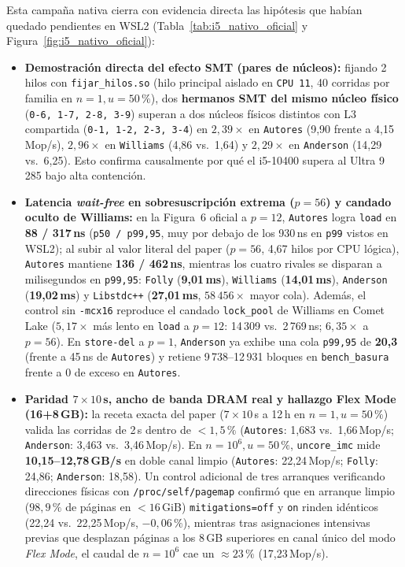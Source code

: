 \documentclass[11pt,a4paper]{article}
\newcommand{\us}{\,\text{\textmu s}}
\begin{document}
Esta campaña nativa cierra con evidencia directa las hipótesis que habían quedado pendientes en WSL2 (Tabla~\ref{tab:i5_nativo_oficial} y Figura~\ref{fig:i5_nativo_oficial}):
\begin{itemize}
  \item \textbf{Demostración directa del efecto SMT (pares de núcleos):} fijando 2 hilos con \texttt{fijar\_hilos.so} (hilo principal aislado en \texttt{CPU 11}, 40 corridas por familia en $n=1, u=50\,\%$), dos \textbf{hermanos SMT del mismo núcleo físico} (\texttt{0-6, 1-7, 2-8, 3-9}) superan a dos núcleos físicos distintos con L3 compartida (\texttt{0-1, 1-2, 2-3, 3-4}) en \textbf{$2,39\times$} en \texttt{Autores} (9,90 frente a 4,15\,Mop/s), \textbf{$2,96\times$} en \texttt{Williams} (4,86 vs.\ 1,64) y \textbf{$2,29\times$} en \texttt{Anderson} (14,29 vs.\ 6,25). Esto confirma causalmente por qué el i5-10400 supera al Ultra 9 285 bajo alta contención.
  \item \textbf{Latencia \emph{wait-free} en sobresuscripción extrema ($p=56$) y candado oculto de Williams:} en la Figura~6 oficial a $p=12$, \texttt{Autores} logra \texttt{load} en \textbf{88 / 317\,ns} (\texttt{p50 / p99,95}, muy por debajo de los 930\,ns en \texttt{p99} vistos en WSL2); al subir al valor literal del paper ($p=56$, 4,67 hilos por CPU lógica), \texttt{Autores} mantiene \textbf{136 / 462\,ns}, mientras los cuatro rivales se disparan a milisegundos en \texttt{p99,95}: \texttt{Folly} (\textbf{9,01\,ms}), \texttt{Williams} (\textbf{14,01\,ms}), \texttt{Anderson} (\textbf{19,02\,ms}) y \texttt{Libstdc++} (\textbf{27,01\,ms}, $58\,456\times$ mayor cola). Además, el control sin \texttt{-mcx16} reproduce el candado \texttt{lock\_pool} de Williams en Comet Lake ($5,17\times$ más lento en \texttt{load} a $p=12$: 14\,309 vs.\ 2\,769\,ns; $6,35\times$ a $p=56$). En \texttt{store-del} a $p=1$, \texttt{Anderson} ya exhibe una cola \texttt{p99,95} de \textbf{20,3\us{}} (frente a 45\,ns de \texttt{Autores}) y retiene 9\,738--12\,931 bloques en \texttt{bench\_basura} frente a 0 de exceso en \texttt{Autores}.
  \item \textbf{Paridad $7\times 10$\,s, ancho de banda DRAM real y hallazgo Flex Mode (16+8\,GB):} la receta exacta del paper ($7\times 10$\,s a 12\,h en $n=1, u=50\,\%$) valida las corridas de 2\,s dentro de $<1,5\,\%$ (\texttt{Autores}: 1,683 vs.\ 1,66\,Mop/s; \texttt{Anderson}: 3,463 vs.\ 3,46\,Mop/s). En $n=10^6, u=50\,\%$, \texttt{uncore\_imc} mide \textbf{10,15--12,78\,GB/s} en doble canal limpio (\texttt{Autores}: 22,24\,Mop/s; \texttt{Folly}: 24,86; \texttt{Anderson}: 18,58). Un control adicional de tres arranques verificando direcciones físicas con \texttt{/proc/self/pagemap} confirmó que en arranque limpio ($98,9\,\%$ de páginas en $<16$\,GiB) \texttt{mitigations=off} y \texttt{on} rinden idénticos (22,24 vs.\ 22,25\,Mop/s, $-0,06\,\%$), mientras tras asignaciones intensivas previas que desplazan páginas a los 8\,GB superiores en canal único del modo \emph{Flex Mode}, el caudal de $n=10^6$ cae un $\approx 23\,\%$ (17,23\,Mop/s).
\end{itemize}
\end{document}
